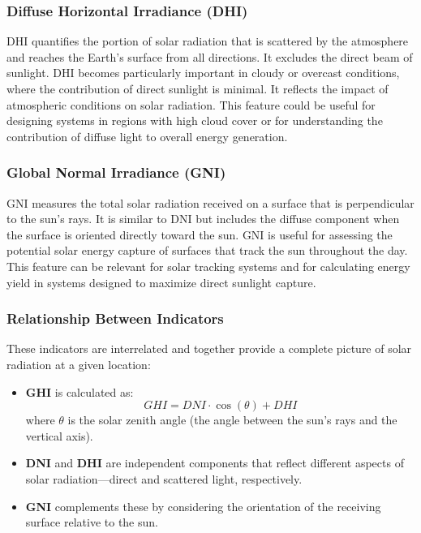 \documentclass[10pt,twocolumn]{article}
\begin{document}
\subsubsection{Diffuse Horizontal Irradiance (DHI)}
\begin{itemize}
    DHI quantifies the portion of solar radiation that is scattered by the atmosphere and reaches the Earth's surface from all directions. It excludes the direct beam of sunlight. DHI becomes particularly important in cloudy or overcast conditions, where the contribution of direct sunlight is minimal. It reflects the impact of atmospheric conditions on solar radiation. This feature could be useful for designing systems in regions with high cloud cover or for understanding the contribution of diffuse light to overall energy generation.
\end{itemize}

\subsubsection{Global Normal Irradiance (GNI)}
\begin{itemize}
     GNI measures the total solar radiation received on a surface that is perpendicular to the sun’s rays. It is similar to DNI but includes the diffuse component when the surface is oriented directly toward the sun. GNI is useful for assessing the potential solar energy capture of surfaces that track the sun throughout the day. This feature can be relevant for solar tracking systems and for calculating energy yield in systems designed to maximize direct sunlight capture.
\end{itemize}

\subsubsection{Relationship Between Indicators}

These indicators are interrelated and together provide a complete picture of solar radiation at a given location:
\begin{itemize}
    \item \textbf{GHI} is calculated as:
    \[
    GHI = DNI \cdot \cos(\theta) + DHI
    \]
    where \( \theta \) is the solar zenith angle (the angle between the sun's rays and the vertical axis).
    \item \textbf{DNI} and \textbf{DHI} are independent components that reflect different aspects of solar radiation—direct and scattered light, respectively.
    \item \textbf{GNI} complements these by considering the orientation of the receiving surface relative to the sun.
\end{itemize}
\end{document}
